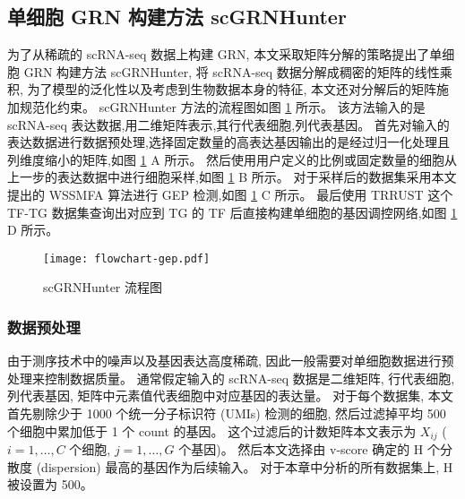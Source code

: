 \subsection{单细胞 GRN 构建方法 scGRNHunter}

为了从稀疏的 scRNA-seq 数据上构建 GRN, 
本文采取矩阵分解的策略提出了单细胞 GRN 构建方法 scGRNHunter, 
将 scRNA-seq 数据分解成稠密的矩阵的线性乘积,
为了模型的泛化性以及考虑到生物数据本身的特征, 本文还对分解后的矩阵施加规范化约束。
scGRNHunter 方法的流程图如图 \ref{fig:gep-flowchart} 所示。
该方法输入的是 scRNA-seq 表达数据,用二维矩阵表示,其行代表细胞,列代表基因。
首先对输入的表达数据进行数据预处理,选择固定数量的高表达基因输出的是经过归一化处理且列维度缩小的矩阵,如图 \ref{fig:gep-flowchart} A 所示。
然后使用用户定义的比例或固定数量的细胞从上一步的表达数据中进行细胞采样,如图 \ref{fig:gep-flowchart} B 所示。
对于采样后的数据集采用本文提出的 WSSMFA 算法进行 GEP 检测,如图 \ref{fig:gep-flowchart} C 所示。
最后使用 TRRUST 这个 TF-TG 数据集查询出对应到 TG 的 TF 后直接构建单细胞的基因调控网络,如图 \ref{fig:gep-flowchart} D 所示。

\begin{figure}[!htbp]
    \centering
    \texttt{[image: flowchart-gep.pdf]}
    \caption{
        scGRNHunter 流程图
    }
    \label{fig:gep-flowchart}
\end{figure}

\subsubsection{数据预处理}
由于测序技术中的噪声以及基因表达高度稀疏, 因此一般需要对单细胞数据进行预处理来控制数据质量。
通常假定输入的 scRNA-seq 数据是二维矩阵, 行代表细胞, 列代表基因, 矩阵中元素值代表细胞中对应基因的表达量。
对于每个数据集, 本文首先剔除少于 1000 个统一分子标识符 (UMIs) 检测的细胞,
然后过滤掉平均 500 个细胞中累加低于 1 个 count 的基因。
这个过滤后的计数矩阵本文表示为 $X_{ij}$ ($i=1,\ldots,C$ 个细胞, $j=1,\ldots,G$ 个基因)。
然后本文选择由 v-score  确定的 H 个分散度 (dispersion) 最高的基因作为后续输入。
对于本章中分析的所有数据集上, H 被设置为 500。

